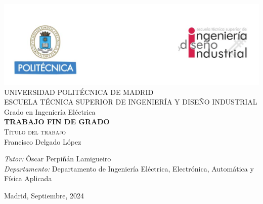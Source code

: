 \begin{center}
	
	\thispagestyle{empty}
		
	\includegraphics[width=1\textwidth]{figuras/cabecera.png}  \\[0.5 cm]
		
	\LARGE UNIVERSIDAD POLITÉCNICA DE MADRID \\ [1 cm]
		
	\LARGE ESCUELA TÉCNICA SUPERIOR DE INGENIERÍA Y DISEÑO INDUSTRIAL \\ [1 cm]
		
	\LARGE Grado en Ingeniería Eléctrica\\ [1 cm]
		
	\LARGE \textbf{TRABAJO FIN DE GRADO}\\[1 cm]
		
	\Huge \textsc{Título del trabajo}\\[1 cm]
		
	\LARGE Francisco Delgado López \\[2 cm]
		
			
	\begin{flushleft} \Large
		\emph{Tutor:} Óscar Perpiñán Lamigueiro\\
		\emph{Departamento:} Departamento de Ingeniería Eléctrica, Electrónica, Automática y Física Aplicada
	\end{flushleft}
			
	
	\vfill
		
	{\large Madrid, Septiembre, 2024}
		
\end{center}

\cleardoublepage 
